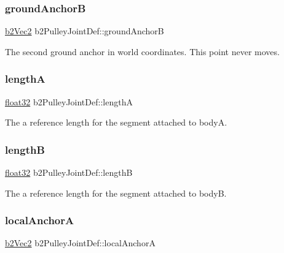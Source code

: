 \subsubsection{\texorpdfstring{groundAnchorB}{groundAnchorB}}
{\footnotesize\ttfamily \mbox{\hyperlink{structb2_vec2}{b2\+Vec2}} b2\+Pulley\+Joint\+Def\+::ground\+AnchorB}



The second ground anchor in world coordinates. This point never moves. 

\mbox{\label{structb2_pulley_joint_def_a51d945882c1d7a78af2b0e9ffb31a33b}} 
\subsubsection{\texorpdfstring{lengthA}{lengthA}}
{\footnotesize\ttfamily \mbox{\hyperlink{b2_settings_8h_aacdc525d6f7bddb3ae95d5c311bd06a1}{float32}} b2\+Pulley\+Joint\+Def\+::lengthA}



The a reference length for the segment attached to bodyA. 

\mbox{\label{structb2_pulley_joint_def_a5857d5b5b9880b6c8201ce3ee8c3eef0}} 
\subsubsection{\texorpdfstring{lengthB}{lengthB}}
{\footnotesize\ttfamily \mbox{\hyperlink{b2_settings_8h_aacdc525d6f7bddb3ae95d5c311bd06a1}{float32}} b2\+Pulley\+Joint\+Def\+::lengthB}



The a reference length for the segment attached to bodyB. 

\mbox{\label{structb2_pulley_joint_def_ad7677a4ad02a6e7cb8699fc5012eac3e}} 
\subsubsection{\texorpdfstring{localAnchorA}{localAnchorA}}
{\footnotesize\ttfamily \mbox{\hyperlink{structb2_vec2}{b2\+Vec2}} b2\+Pulley\+Joint\+Def\+::local\+AnchorA}



